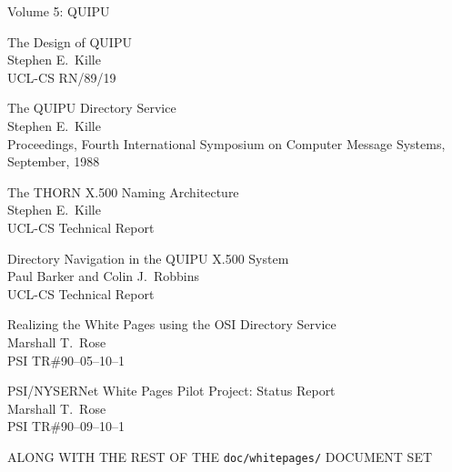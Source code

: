 \begin{bwslide}
\small

\begin{nrtc}
\item	Volume 5: QUIPU

\item	The Design of QUIPU\\
	Stephen E.~Kille\\
	UCL-CS RN/89/19

\item	The QUIPU Directory Service\\
	Stephen E.~Kille\\
        Proceedings, Fourth International Symposium on Computer Message
	Systems, September, 1988

\item	The THORN X.500 Naming Architecture\\
	Stephen E.~Kille\\
	UCL-CS Technical Report

\item	Directory Navigation in the QUIPU X.500 System\\
	Paul Barker and Colin J.~Robbins\\
	UCL-CS Technical Report

\item	Realizing the White Pages using the OSI Directory Service\\
	Marshall T.~Rose\\
	PSI TR\#90--05--10--1

\item	PSI/NYSERNet White Pages Pilot Project: Status Report\\
	Marshall T.~Rose\\
	PSI TR\#90--09--10--1

\item	ALONG WITH THE REST OF THE \verb"doc/whitepages/" DOCUMENT SET
\end{nrtc}
\end{bwslide}
